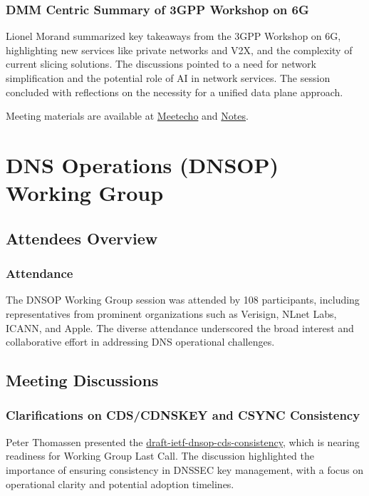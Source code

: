 \documentclass{article}
\begin{document}
\subsubsection{DMM Centric Summary of 3GPP Workshop on 6G}
Lionel Morand summarized key takeaways from the 3GPP Workshop on 6G, highlighting new services like private networks and V2X, and the complexity of current slicing solutions. The discussions pointed to a need for network simplification and the potential role of AI in network services. The session concluded with reflections on the necessity for a unified data plane approach.

Meeting materials are available at \href{https://meetings.conf.meetecho.com/ietf122/?group=dmm&short=dmm&item=1}{Meetecho} and \href{https://notes.ietf.org/notes-ietf-122-dmm}{Notes}.



\newpage

\section{DNS Operations (DNSOP) Working Group}

\subsection{Attendees Overview}
\subsubsection{Attendance}
The DNSOP Working Group session was attended by 108 participants, including representatives from prominent organizations such as Verisign, NLnet Labs, ICANN, and Apple. The diverse attendance underscored the broad interest and collaborative effort in addressing DNS operational challenges.

\subsection{Meeting Discussions}

\subsubsection{Clarifications on CDS/CDNSKEY and CSYNC Consistency}
Peter Thomassen presented the \href{https://datatracker.ietf.org/doc/html/draft-ietf-dnsop-cds-consistency}{draft-ietf-dnsop-cds-consistency}, which is nearing readiness for Working Group Last Call. The discussion highlighted the importance of ensuring consistency in DNSSEC key management, with a focus on operational clarity and potential adoption timelines.
\end{document}
